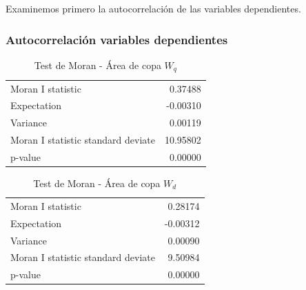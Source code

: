 \documentclass[12pt,]{book}
\begin{document}
Examinemos primero la autocorrelación de las variables dependientes.

\subsubsection{Autocorrelación variables
dependientes}\label{autocorrelacion-variables-dependientes}

\begin{table}

\caption{\label{tab:moran-copa-wq}Test de Moran - Área de copa $W_q$}
\centering
\begin{tabular}[t]{lr}
\toprule
  &  \\
\midrule
Moran I statistic & 0.37488\\
Expectation & -0.00310\\
Variance & 0.00119\\
Moran I statistic standard deviate & 10.95802\\
p-value & 0.00000\\
\bottomrule
\end{tabular}
\end{table}

\begin{table}

\caption{\label{tab:moran-copa-wd}Test de Moran - Área de copa $W_d$}
\centering
\begin{tabular}[t]{lr}
\toprule
  &  \\
\midrule
Moran I statistic & 0.28174\\
Expectation & -0.00312\\
Variance & 0.00090\\
Moran I statistic standard deviate & 9.50984\\
p-value & 0.00000\\
\bottomrule
\end{tabular}
\end{table}
\end{document}
